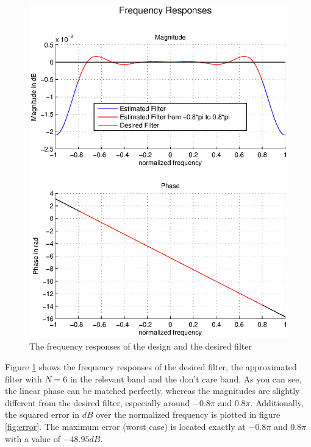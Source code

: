 \begin{figure}[h]
\centering
\includegraphics[width=\textwidth]{pics/fig1.eps}
\caption{The frequency responses of the design and the desired filter}
\label{fig:freqz}
\end{figure}

Figure \ref{fig:freqz} shows the frequency responses of the desired filter, the approximated filter with $N=6$ in the relevant band and the don't care band. As you can see, the linear phase can be matched perfectly, whereas the magnitudes are slightly different from the desired filter, especially around $-0.8\pi$ and $0.8\pi$. Additionally, the squared error in $dB$ over the normalized frequency is plotted in figure \ref{fig:error}. The maximum error (worst case) is located exactly at $-0.8\pi$ and $0.8\pi$ with a value of $-48.95dB$.

